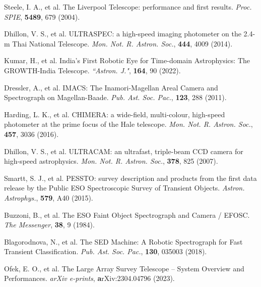 \documentclass{nature_plusfigure}
\newcommand{\mn}{{Mon. Not. R. Astron. Soc.}}
\newcommand{\mnras}{\mn}
\newcommand{\aj}{{``Astron. J."}}
\newcommand{\aap}{{Astron. Astrophys.}}
\newcommand{\pasp}{{Pub. Ast. Soc. Pac.}}
\newcommand{\procspie}{Proc. SPIE}
\begin{document}
\begin{methods}
\begin{thebibliography}{10}

 Steele, I. A., et al. The Liverpool Telescope: performance and first results. \emph{\procspie}, \textbf{5489}, 679 (2004). 


 Dhillon, V. S., et al. ULTRASPEC: a high-speed imaging photometer on the 2.4-m Thai National Telescope. \emph{\mnras}, \textbf{444}, 4009 (2014). 


 Kumar, H., et al. India's First Robotic Eye for Time-domain Astrophysics: The GROWTH-India Telescope. \emph{\aj}, \textbf{164}, 90 (2022). 



 Dressler, A., et al. IMACS: The Inamori-Magellan Areal Camera and Spectrograph on Magellan-Baade. \emph{\pasp}, \textbf{123}, 288 (2011). 


 Harding, L. K., et al. CHIMERA: a wide-field, multi-colour, high-speed photometer at the prime focus of the Hale telescope. \emph{\mnras}, \textbf{457}, 3036 (2016). 

 Dhillon, V. S., et al. ULTRACAM: an ultrafast, triple-beam CCD camera for high-speed astrophysics. \emph{\mnras}, \textbf{378}, 825 (2007). 


 Smartt, S. J., et al. PESSTO: survey description and products from the first data release by the Public ESO Spectroscopic Survey of Transient Objects. \emph{\aap}, \textbf{579}, A40 (2015). 

 Buzzoni, B., et al. The ESO Faint Object Spectrograph and Camera / EFOSC. \emph{The Messenger}, \textbf{38}, 9 (1984). 


 Blagorodnova, N., et al. The SED Machine: A Robotic Spectrograph for Fast Transient Classification. \emph{\pasp}, \textbf{130}, 035003 (2018). 


 Ofek, E. O., et al. The Large Array Survey Telescope -- System Overview and Performances. \emph{arXiv e-prints}, \textbf arXiv:2304.04796 (2023). 


\end{thebibliography}
\end{methods}
\end{document}

